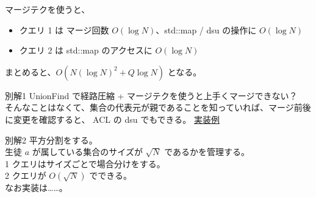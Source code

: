 \documentclass[dvipdfmx,12pt]{beamer}%
\begin{document}
\begin{frame}
マージテクを使うと、
\begin{itemize}
	\item クエリ 1 は マージ回数 $ O (\log N) $、std::map / dsu の操作に $ O (\log N) $ 
	\item クエリ 2 は std::map のアクセスに $ O (\log N) $ 
\end{itemize}
まとめると、$ O(N(\log N)^2+Q\log N) $ となる。
\end{frame}

\begin{frame}{別解1}
UnionFind で経路圧縮 + マージテクを使うと上手くマージできない？\\
そんなことはなくて、集合の代表元が親であることを知っていれば、マージ前後に変更を確認すると、 ACL の dsu でもできる。
\href{https://atcoder.jp/contests/abc183/submissions/18254918}{実装例}

\end{frame}

\begin{frame}{別解2}
平方分割をする。\\
生徒 $ a $ が属している集合のサイズが $ \sqrt{N} $ であるかを管理する。\\
1 クエリはサイズごとで場合分けをする。\\
2 クエリが $ O(\sqrt{N}) $ でできる。\\
なお実装は……。
\end{frame}
\end{document}
